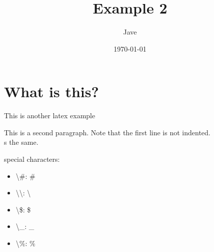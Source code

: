 \documentclass[letterpaper, 12pt]{article}
\begin{document}
\date{\today}
\title{Example 2}
\author{Jave}
\maketitle
\section{What is this?}
This is another latex example

This is a second paragraph. Note that the first line is not indented.\\ %
s the same.

\noindent special characters:
\begin{itemize}
    \item \textbackslash{}\#: \#           
    \item \textbackslash{}\textbackslash: \textbackslash 
    \item \textbackslash{}\$: \$            
    \item \textbackslash{}\_: \_
    \item \textbackslash{}\%: \%
\end{itemize}
\end{document}
